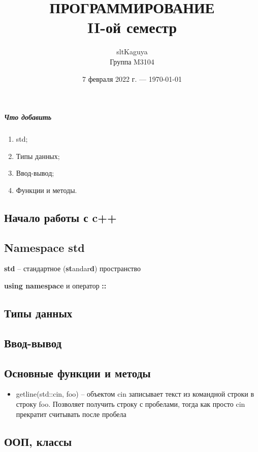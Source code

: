 \documentclass[a4paper,12pt]{article}
\title{ПРОГРАММИРОВАНИЕ\\
    \large II-ой семестр}
\author{sltKaguya\\
    Группа M3104}
\date{7 февраля 2022 г. --- \today}
\begin{document}
\maketitle
\newpage
{}

\subparagraph*{Что добавить}
\begin{enumerate}
    \item std;
    \item Типы данных;
    \item Ввод-вывод;
    \item Функции и методы.
\end{enumerate}

\begin{center}
    \section*{Начало работы с c++}
\end{center}

\subsection*{Namespace std}
\qquad\textbf{std} -- стандартное (\textbf{st}andar\textbf{d}) пространство

\textbf{using namespace} и оператор \textbf{::}

\subsection*{Типы данных}

\subsection*{Ввод-вывод}

\subsection*{Основные функции и методы}

\begin{itemize}
    \item getline(std::cin, foo) -- объектом cin записывает текст из командной строки в строку foo. Позволяет получить строку с пробелами, тогда как просто cin прекратит считывать после пробела
\end{itemize}

\begin{center}
    \section*{ООП, классы}
\end{center}
\end{document}
